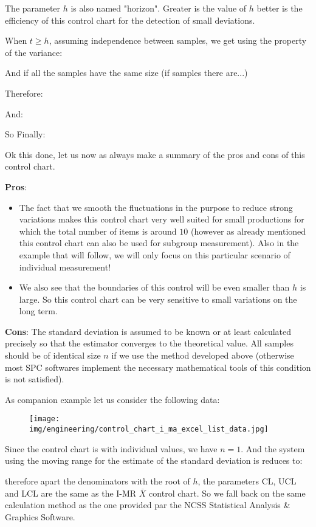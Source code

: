 	The parameter $h$ is also named "horizon". Greater is the value of $h$ better is the efficiency of this control chart for the detection of small deviations.

	When $t\geq h$, assuming independence between samples, we get using the property of the variance:
	
	And if all the samples have the same size (if samples there are...)
	
	Therefore:
	 
	And:
	 	
	So Finally:
	
	Ok this done, let us now as always make a summary of the pros and cons of this control chart.
	
	\textbf{Pros}:
	\begin{itemize}
		\item The fact that we smooth the fluctuations in the purpose to reduce strong variations makes this control chart very well suited for small productions for which the total number of items is around $10$ (however as already mentioned this control chart can also be used for subgroup measurement). Also in the example that will follow, we will only focus on this particular scenario of individual measurement! 

		\item We also see that the boundaries of this control will be even smaller than $h$ is large. So this control chart can be very sensitive to small variations on the long term.
	\end{itemize}

	\textbf{Cons}:  The standard deviation is assumed to be known or at least calculated precisely so that the estimator converges to the theoretical value. All samples should be of identical size $n$ if we use the method developed above (otherwise most SPC softwares implement the necessary mathematical tools of this condition is not satisfied).
	
	As companion example let us consider the following data:
	\begin{figure}[H]
		\centering
		\texttt{[image: img/engineering/control\_chart\_i\_ma\_excel\_list\_data.jpg]}
	\end{figure}
	Since the control chart is with individual values, we have $n=1$. And the system using the moving range for the estimate of the standard deviation is reduces to:
	
	therefore apart the denominators with the root of $h$, the parameters CL, UCL and LCL are the same as the I-MR $\overline{X}$ control chart. So we fall back on the same calculation method as the one provided par the NCSS Statistical Analysis \& Graphics Software.
	
